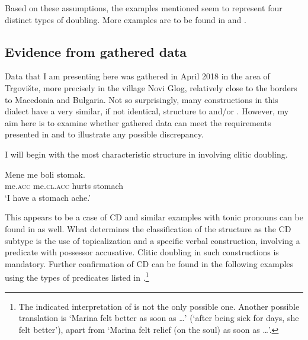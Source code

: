 \documentclass[output=paper,
colorlinks,
citecolor=brown,
newtxmath
]{langscibook}
\begin{document}
\noindent Based on these assumptions, the examples mentioned seem to represent four distinct types of doubling. More examples are to be found in \citet{Krapova.Karastaneva2002} and \citet{Cinque.Krapova2008}.

\subsection{Evidence from gathered data}                            %
\label{subsec:evidence}
Data that I am presenting here was gathered in April 2018 in the area of Trgovište, more precisely in the village Novi Glog, relatively close to the borders to Macedonia and Bulgaria. Not so surprisingly, many constructions in this dialect have a very similar, if not identical, structure to  and/or . However, my aim here is to examine whether gathered data can meet the requirements presented in \citet{Cinque.Krapova2008} and to illustrate any possible discrepancy.

I will begin with the most characteristic structure in  involving clitic doubling.


\ea\label{ex:zivojinovic:10}
\gll Mene   me        boli  stomak.\\
     me.\textsc{acc} me.\textsc{cl.acc} hurts stomach \\
\glt `I have a stomach ache.'
\z

\noindent This appears to be a case of CD and similar examples with tonic pronouns can be found in  as well. What determines the classification of the structure as the CD subtype is the use of topicalization and a specific verbal construction, involving a predicate with possessor accusative. Clitic doubling in such constructions is mandatory.
Further confirmation of CD can be found in the following examples using the types of predicates listed in \citet{Cinque.Krapova2008}.\footnote{The indicated interpretation of  is not the only possible one. Another possible translation is `Marina felt better as soon as {\dots}' (`after being sick for days, she felt better'), apart from `Marina felt relief (on the soul) as soon as {\dots}'.}
\end{document}
